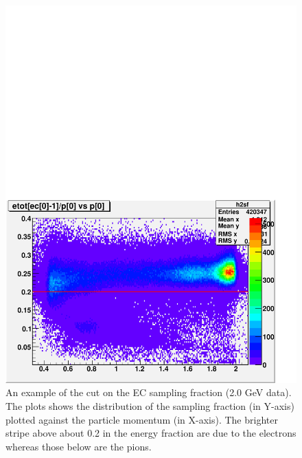 \begin{figure}[H] %
\centering
\leavevmode \includegraphics[width=1.0\textwidth]{figuresEG4/FigCuts/ecCuts_sfVp2D_Eb2allEv.pdf}  %
\caption[EC sampling fraction cut (2.0 GeV)]{An example of the cut on the EC sampling fraction (2.0 GeV data). The plots shows the distribution of the sampling fraction (in Y-axis) plotted against the particle momentum (in X-axis). The brighter stripe above about 0.2 in the energy fraction are due to the electrons whereas those below are the pions.
}
\label{ecSf}
\end{figure}


